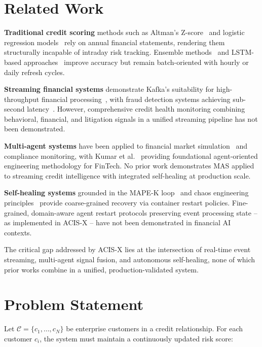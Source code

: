 ﻿\documentclass[runningheads]{llncs}
\begin{document}
\section{Related Work}
\label{sec:related}

\textbf{Traditional credit scoring} methods such as Altman's Z-score~\cite{altman1968financial} and logistic regression models~\cite{wang2024explainable} rely on annual financial statements, rendering them structurally incapable of intraday risk tracking. Ensemble methods~\cite{li2024ensemble} and LSTM-based approaches~\cite{chen2025streaming} improve accuracy but remain batch-oriented with hourly or daily refresh cycles.

\textbf{Streaming financial systems} demonstrate Kafka's suitability for high-throughput financial processing~\cite{kreps2011kafka}, with fraud detection systems achieving sub-second latency~\cite{liu2025realtime}. However, comprehensive credit health monitoring combining behavioral, financial, and litigation signals in a unified streaming pipeline has not been demonstrated.

\textbf{Multi-agent systems} have been applied to financial market simulation~\cite{zhao2024multiagent} and compliance monitoring, with Kumar et al.~\cite{kumar2024engineering} providing foundational agent-oriented engineering methodology for FinTech. No prior work demonstrates MAS applied to streaming credit intelligence with integrated self-healing at production scale.

\textbf{Self-healing systems} grounded in the MAPE-K loop~\cite{singh2025selfhealing} and chaos engineering principles~\cite{patel2024chaos} provide coarse-grained recovery via container restart policies. Fine-grained, domain-aware agent restart protocols preserving event processing state -- as implemented in ACIS-X -- have not been demonstrated in financial AI contexts.

The critical gap addressed by ACIS-X lies at the intersection of real-time event streaming, multi-agent signal fusion, and autonomous self-healing, none of which prior works combine in a unified, production-validated system.

\section{Problem Statement}
\label{sec:problem}

Let $\mathcal{C} = \{c_1,\ldots,c_N\}$ be enterprise customers in a credit relationship. For each customer $c_i$, the system must maintain a continuously updated risk score:
\end{document}
